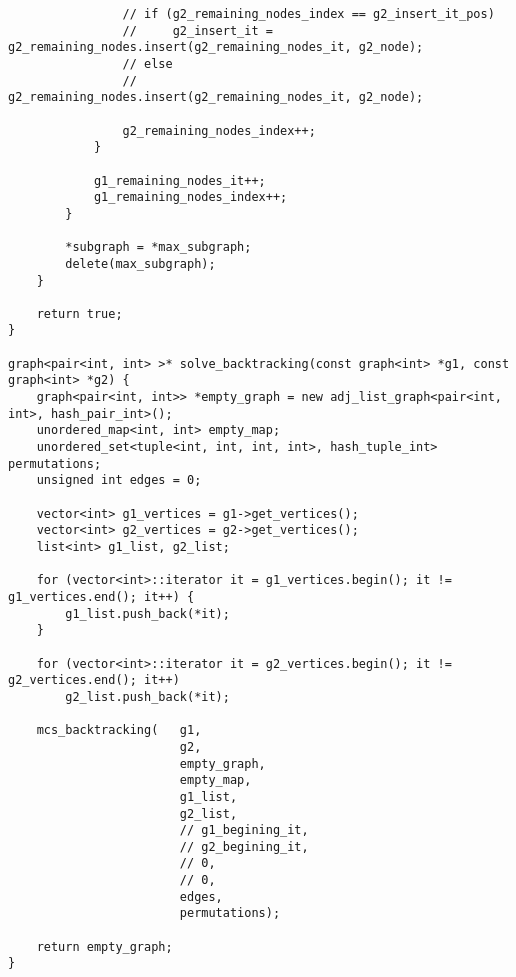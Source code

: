 \begin{lstlisting}
                // if (g2_remaining_nodes_index == g2_insert_it_pos)
                //     g2_insert_it = g2_remaining_nodes.insert(g2_remaining_nodes_it, g2_node);
                // else
                //     g2_remaining_nodes.insert(g2_remaining_nodes_it, g2_node);

                g2_remaining_nodes_index++;
            }

            g1_remaining_nodes_it++;
            g1_remaining_nodes_index++;
        }

        *subgraph = *max_subgraph;
        delete(max_subgraph);
    }

    return true;
}

graph<pair<int, int> >* solve_backtracking(const graph<int> *g1, const graph<int> *g2) {
    graph<pair<int, int>> *empty_graph = new adj_list_graph<pair<int, int>, hash_pair_int>();
    unordered_map<int, int> empty_map;
    unordered_set<tuple<int, int, int, int>, hash_tuple_int> permutations;
    unsigned int edges = 0;

    vector<int> g1_vertices = g1->get_vertices();
    vector<int> g2_vertices = g2->get_vertices();
    list<int> g1_list, g2_list;

    for (vector<int>::iterator it = g1_vertices.begin(); it != g1_vertices.end(); it++) {
        g1_list.push_back(*it);
    }

    for (vector<int>::iterator it = g2_vertices.begin(); it != g2_vertices.end(); it++)
        g2_list.push_back(*it);

    mcs_backtracking(   g1,
                        g2,
                        empty_graph,
                        empty_map,
                        g1_list,
                        g2_list,
                        // g1_begining_it,
                        // g2_begining_it,
                        // 0,
                        // 0,
                        edges,
                        permutations);

    return empty_graph;
}

\end{lstlisting}

